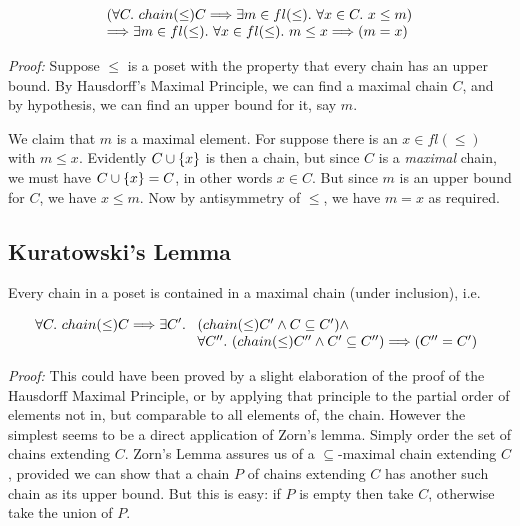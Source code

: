 $$ \begin{array}[t]{l} (\forall C.\ chain(\leq) C \Longrightarrow \exists m \in fl(\leq).\
            \forall x \in C.\ x \leq m) \\
     \Longrightarrow
       \exists m \in fl(\leq).\
            \forall x \in fl(\leq).\ m \leq x \Longrightarrow (m = x)
   \end{array} $$

{\em Proof:} Suppose $\leq$ is a poset with the property that every chain has an
upper bound. By Hausdorff's Maximal Principle, we can find a maximal chain $C$,
and by hypothesis, we can find an upper bound for it, say $m$.

We claim that $m$ is a maximal element. For suppose there is an $x \in fl(\leq)$ with
$m \leq x$. Evidently $C \cup \{x\}$ is then a chain, but since $C$ is a
{\em maximal} chain, we must have $C \cup \{x\} = C$, in other words
$x \in C $. But since $m$ is an upper bound for $C$, we have $x \leq m$. Now by
antisymmetry of $\leq$, we have $m = x$ as required.

\subsection{Kuratowski's Lemma}

Every chain in a poset is contained in a maximal chain (under inclusion), i.e.

$$ \forall C.\ chain(\leq) C \Longrightarrow
     \exists C'.\ \begin{array}[t]{l} (chain(\leq) C' \wedge C \subseteq C') \wedge \\
                      \forall C''.\ (chain(\leq) C'' \wedge C' \subseteq C'')
                                \Longrightarrow (C'' = C')
          \end{array} $$

{\em Proof:} This could have been proved by a slight elaboration of the proof
of the Hausdorff Maximal Principle, or by applying that principle to the
partial order of elements not in, but comparable to all elements of, the chain.
However the simplest seems to be a direct application of Zorn's lemma. Simply
order the set of chains extending $C$. Zorn's Lemma assures us of a
$\subseteq$-maximal chain extending $C$, provided we can show that a chain $P$
of chains extending $C$ has another such chain as its upper bound. But this is
easy: if $P$ is empty then take $C$, otherwise take the union of $P$.
